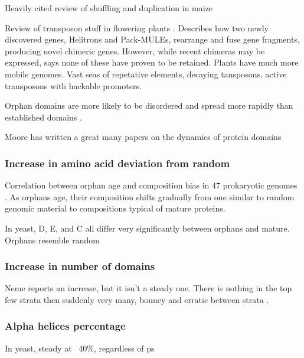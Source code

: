     Heavily cited review of shuffling and duplication in maize
    \cite{morgante_gene_2005}

    Review of transposon stuff in flowering plants
    \cite{bennetzen_transposable_2005}. Describes how two newly discovered
    genes, Helitrons and Pack-MULEs, rearrange and fuse gene fragments,
    producing novel chimeric genes. However, while recent chimeras may be
    expressed, says none of these have proven to be retained. Plants have much
    more mobile genomes. Vast seas of repetative elements, decaying tansposons,
    active transposons with hackable promoters.

    Orphan domains are more likely to be disordered and spread more rapidly
    than established domains \cite{moore_dynamics_2011}.

    Moore has written a great many papers on the dynamics of protein
    domains \cite{moore_arrangements_2008, moore_dynamics_2011,
    moore_quantification_2013}

  \subsubsection{Increase in amino acid deviation from random}

    Correlation between orphan age and composition bias in 47
    prokaryotic genomes \cite{yomtovian_composition_2010}. As orphans
    age, their composition shifts gradually from one similar to random
    genomic material to compositions typical of mature proteins.

    In yeast, D, E, and C all differ very significantly between orphans
    and mature. Orphans resemble random
    \cite{carvunis_proto-genes_2012}

  \subsubsection{Increase in number of domains}

    Neme reports an increase, but it isn't a steady one. There is
    nothing in the top few strata then suddenly very many, bouncy and
    erratic between strata \cite{neme_phylogenetic_2013}.

  \subsubsection{Alpha helices percentage}

    In yeast, steady at ~40\%, regardless of ps
    \cite{abrusan_integration_2013} 

